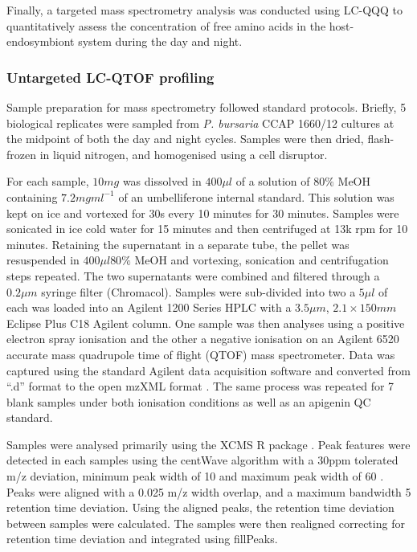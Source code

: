 Finally, a targeted mass spectrometry analysis was conducted using
LC-QQQ to quantitatively assess the concentration of free amino acids
in the host-endosymbiont system during the day and night.

\subsubsection{Untargeted LC-QTOF profiling}

Sample preparation for mass spectrometry followed standard protocols.
Briefly, 5 biological replicates were sampled from \textit{P. bursaria} CCAP 1660/12 
cultures at the midpoint of both the day and night cycles. 
Samples were then dried, flash-frozen in liquid nitrogen, and homogenised
using a cell disruptor. 

For each sample, \(10mg\) was dissolved in \(400\mu l\)
of a solution of \(80\%\) MeOH containing \(7.2mg ml^{-1}\) of
an umbelliferone internal standard.  This solution was kept on ice
and vortexed for 30s every 10 minutes for 30 minutes.
Samples were sonicated in ice cold water for 15 minutes and then centrifuged
at 13k rpm for 10 minutes.  Retaining the supernatant in a separate tube, the pellet
was resuspended in \(400\mu l 80\%\) MeOH and vortexing, sonication and centrifugation
steps repeated.  The two supernatants were combined and filtered through 
a \(0.2\mu m\) syringe filter (Chromacol).  Samples were sub-divided into two 
a \(5\mu l\) of each was loaded into an Agilent 1200 Series HPLC with
a \(3.5\mu m\), \(2.1\times 150mm\) Eclipse Plus C18 Agilent column.
One sample was then analyses using a positive electron spray ionisation
and the other a negative ionisation on an Agilent 6520 accurate mass
quadrupole time of flight (QTOF) mass spectrometer. Data was captured
using the standard Agilent data acquisition software and converted
from ``.d'' format to the open mzXML format \citep{Pedrioli2004}.
The same process was repeated for 7 blank samples under both ionisation conditions
as well as an apigenin QC standard.

Samples were analysed primarily using the XCMS R package \citep{Smith2006,Tautenhahn2012}.
Peak features were detected in each samples using the centWave algorithm with a 30ppm tolerated m/z deviation,
minimum peak width of 10 and maximum peak width of 60 \citep{Tautenhahn2008}. 
Peaks were aligned with a 0.025 m/z width overlap, and a maximum bandwidth 5 retention time
deviation. Using the aligned peaks, the retention time deviation between samples were
calculated.  The samples were then realigned correcting for retention time deviation and
integrated using fillPeaks. 

